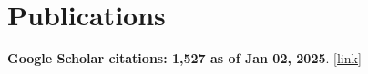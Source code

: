 \documentclass[11pt,a4paper,roman]{moderncv} %
\begin{document}
\section{Publications}
\vspace*{1mm}
{\color{color1} {\bfseries Google Scholar citations: 1,527 as of Jan 02, 2025}. \href{https://scholar.google.com/citations?user=Aqf-7Y0AAAAJ&hl=en}{[link]}}

\vspace*{3mm}
\end{document}
